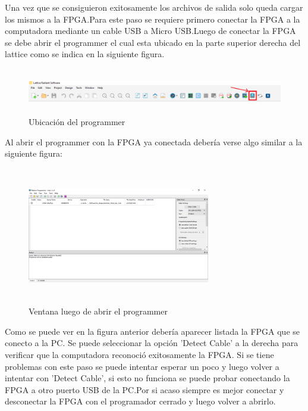 \documentclass{article}
\begin{document}
Una vez que se consiguieron exitosamente los archivos de salida solo queda cargar los mismos a la FPGA.Para este paso se requiere primero conectar la FPGA a la computadora mediante un cable USB a Micro USB.Luego de conectar la FPGA se debe abrir el programmer el cual esta ubicado en la parte superior derecha del lattice como se indica en la siguiente figura.
	\begin{figure}[H]
 	\centering
	\includegraphics[height=2cm, width=\textwidth]{Imagenes/ProgrammerUbi.png}
	\caption{Ubicación del programmer}
	\end{figure}

Al abrir el programmer con la FPGA ya conectada debería verse algo similar a la siguiente figura:
	\begin{figure}[H]
 	\centering
	\includegraphics[height=6cm, width=8cm]{Imagenes/Programmer.png}
	\caption{Ventana luego de abrir el programmer}
	\end{figure}
Como se puede ver en la figura anterior debería aparecer listada la FPGA que se conecto a la PC. Se puede seleccionar la opción 'Detect Cable' a la derecha para verificar que la computadora reconoció exitosamente la FPGA. Si se tiene problemas con este paso se puede intentar esperar un poco y luego volver a intentar con 'Detect Cable', si esto no funciona se puede probar conectando la FPGA a otro puerto USB de la PC.Por si acaso siempre es mejor conectar y desconectar la FPGA con el programador cerrado y luego volver a abrirlo.
\end{document}
